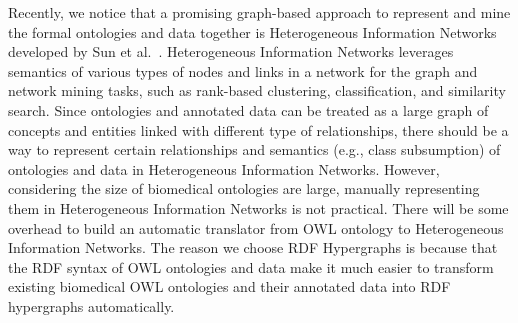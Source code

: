 Recently, we notice that a promising graph-based approach to represent and mine the formal ontologies and data together is Heterogeneous Information Networks developed by Sun et al.~\cite{2012Sun, SunNHYYY12, YuSNMH12, YangCSH12, SunHYYW11}. Heterogeneous Information Networks leverages semantics of various types of nodes and links in a network for the graph and network mining tasks, such as rank-based clustering, classification, and similarity search. Since ontologies and annotated data can be treated as a large graph of concepts and entities linked with different type of relationships, there should be a way to represent certain relationships and semantics (e.g., class subsumption) of ontologies and data in Heterogeneous Information Networks. However, considering the size of biomedical ontologies are large, manually representing them in Heterogeneous Information Networks is not practical. There will be some overhead to build an automatic translator from OWL ontology to Heterogeneous Information Networks. The reason we choose RDF Hypergraphs is because that the RDF syntax of OWL ontologies and data make it much easier to transform existing biomedical OWL ontologies and their annotated data into RDF hypergraphs automatically.


